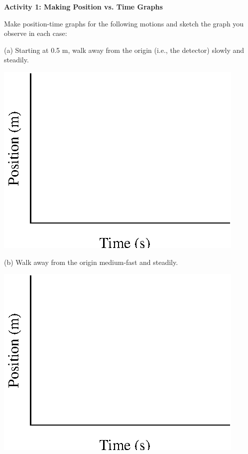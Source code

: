 \textbf{Activity 1: Making Position vs. Time Graphs }

Make position-time graphs for the following motions and sketch the graph you
observe in each case:

(a) Starting at 0.5 m, walk away from the origin (i.e., the detector) slowly
and steadily.

\vspace{0.3cm}
{\par\centering \includegraphics{position_fig1.eps} \par}
\vspace{0.3cm}

(b) Walk away from the origin medium-fast and steadily.

\vspace{0.3cm}
{\par\centering \includegraphics{position_fig1.eps} \par}
\vspace{0.3cm}

